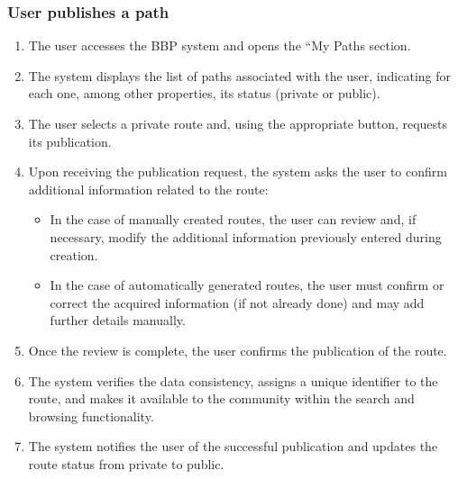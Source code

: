 \subsubsection*{User publishes a path}
\begin{enumerate}
    \item The user accesses the BBP system and opens the “My Paths section.
    \item The system displays the list of paths associated with the user, indicating for each one, among other properties, its status (private or public).
    \item The user selects a private route and, using the appropriate button, requests its publication.
    \item Upon receiving the publication request, the system asks the user to confirm additional information related to the route:
        \begin{itemize}
            \item In the case of manually created routes, the user can review and, if necessary, modify the additional information previously entered during creation.
            \item In the case of automatically generated routes, the user must confirm or correct the acquired information (if not already done) and may add further details manually.
        \end{itemize}
    \item Once the review is complete, the user confirms the publication of the route.
    \item The system verifies the data consistency, assigns a unique identifier to the route, and makes it available to the community within the search and browsing functionality.
    \item The system notifies the user of the successful publication and updates the route status from private to public.
\end{enumerate}
